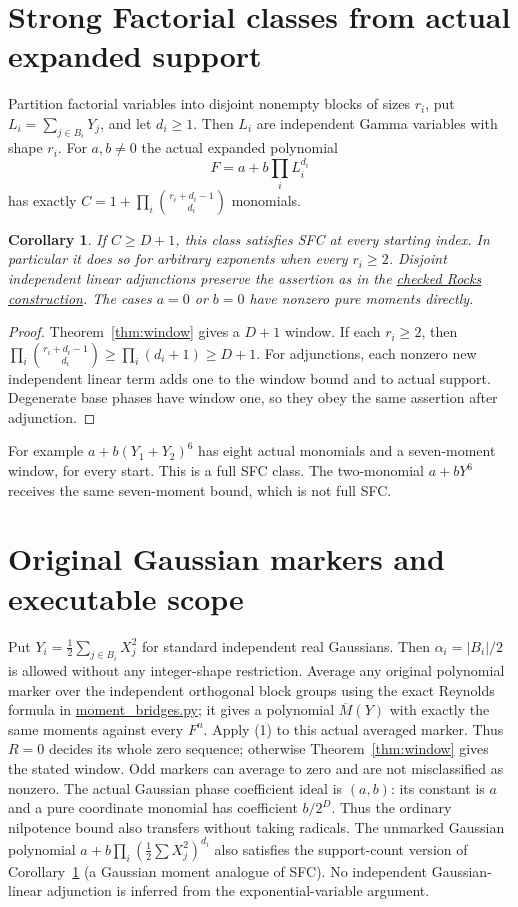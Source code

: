 \documentclass[11pt]{article}
\newtheorem{corollary}[theorem]{Corollary}
\begin{document}
\section{Strong Factorial classes from actual expanded support}
Partition factorial variables into disjoint nonempty blocks of sizes $r_i$,
put $L_i=\sum_{j\in B_i}Y_j$, and let $d_i\geq1$.
Then $L_i$ are independent Gamma variables with shape $r_i$.
For $a,b\ne0$ the actual expanded polynomial
\[
 F=a+b\prod_i L_i^{d_i}
\]
has exactly $C=1+\prod_i\binom{r_i+d_i-1}{d_i}$ monomials.
\begin{corollary}\label{cor:sfc}
If $C\geq D+1$, this class satisfies SFC at every starting index.
In particular it does so for arbitrary exponents when every $r_i\geq2$.
Disjoint independent linear adjunctions preserve the assertion as in the
\href{SFC_WINDOWS_AND_ROCKS_AUDIT.tex}{checked Rocks construction}.
The cases $a=0$ or $b=0$ have nonzero pure moments directly.
\end{corollary}
\begin{proof}
Theorem~\ref{thm:window} gives a $D+1$ window. If each $r_i\geq2$, then
$\prod_i\binom{r_i+d_i-1}{d_i}\geq\prod_i(d_i+1)\geq D+1$.
For adjunctions, each nonzero new independent linear term adds one to
the window bound and to actual support. Degenerate base phases have
window one, so they obey the same assertion after adjunction.
\end{proof}
For example $a+b(Y_1+Y_2)^6$ has eight actual monomials and a seven-moment
window, for every start. This is a full SFC class. The two-monomial
$a+bY^6$ receives the same seven-moment bound, which is not full SFC.

\section{Original Gaussian markers and executable scope}
Put $Y_i=\frac12\sum_{j\in B_i}X_j^2$ for standard independent real
Gaussians. Then $\alpha_i=|B_i|/2$ is allowed without any integer-shape
restriction. Average any original polynomial marker over the independent
orthogonal block groups using the exact Reynolds formula in
\href{moment_bridges.py}{moment\_bridges.py}; it gives a polynomial
$\overline M(Y)$ with exactly the same moments against every $F^n$.
Apply (1) to this actual averaged marker. Thus $R=0$ decides its whole
zero sequence; otherwise Theorem~\ref{thm:window} gives the stated window.
Odd markers can average to zero and are not misclassified as nonzero.
The actual Gaussian phase coefficient ideal is $(a,b)$: its constant is
$a$ and a pure coordinate monomial has coefficient $b/2^D$. Thus the
ordinary nilpotence bound also transfers without taking radicals.
The unmarked Gaussian polynomial $a+b\prod_i(\frac12\sum X_j^2)^{d_i}$
also satisfies the support-count version of Corollary~\ref{cor:sfc}
(a Gaussian moment analogue of SFC). No independent Gaussian-linear
adjunction is inferred from the exponential-variable argument.
\end{document}
